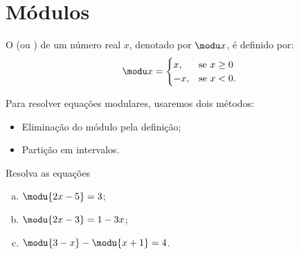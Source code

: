\section{Módulos}

\begin{definition}
O  (ou ) de um número real $x$,
denotado por $\modu x$, é definido por:
%
\begin{align*}
\modu x =
\begin{cases}
x , & \text{se $x \ge 0$} \\
-x, & \text{se $x<0$}.
\end{cases}
\end{align*}
\end{definition}

\noindent Para resolver equações modulares, usaremos dois métodos:
%
\begin{itemize}
  \item Eliminação do módulo pela definição;
  \item Partição em intervalos.
\end{itemize}

\begin{example}
Resolva as equações
\begin{enumerate}[(a)]
  \item $\modu {2x-5} = 3$;
  \item $\modu{2x-3} = 1-3x$;
  \item $\modu{3-x} - \modu{x+1} = 4$.
\end{enumerate}
\end{example}

